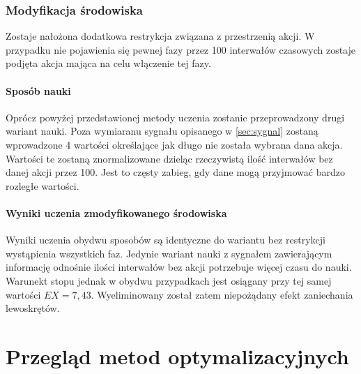 \documentclass[12pt]{book}
\theoremstyle{plain}
\begin{document}
\subsection{Modyfikacja środowiska}
Zostaje nałożona dodatkowa restrykcja związana z przestrzenią akcji. W przypadku nie pojawienia się pewnej fazy przez 100 interwałów czasowych zostaje podjęta akcja mająca na celu włączenie tej fazy.
\subsubsection*{Sposób nauki}
Oprócz powyżej przedstawionej metody uczenia zostanie przeprowadzony drugi wariant nauki. Poza wymiaranu sygnału opisanego w \ref{sec:sygnal} zostaną wprowadzone 4 wartości określające jak długo nie została wybrana dana akcja. Wartości te zostaną znormalizowane dzieląc rzeczywistą ilość interwałów bez danej akcji przez 100. Jest to częsty zabieg, gdy dane mogą przyjmować bardzo rozległe wartości.
\subsubsection*{Wyniki uczenia zmodyfikowanego środowiska}
Wyniki uczenia obydwu sposobów są identyczne do wariantu bez restrykcji wystąpienia wszystkich faz. Jedynie wariant nauki z sygnałem zawierającym informację odnośnie ilości interwałów bez akcji potrzebuje więcej czasu do nauki. Warunekt stopu jednak w obydwu przypadkach jest osiągany przy tej samej wartości $EX=7,43$. Wyeliminowany został zatem niepożądany efekt zaniechania lewoskrętów.

\chapter{Przegląd metod optymalizacyjnych}
\end{document}
